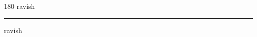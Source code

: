 
\begin{frame}
\begin{center}
\begin{turn}{180}
{\fontsize{2.5cm}{1em}\selectfont ravish}
\end{turn}
\vspace{1em}\par  
\hrule
\vspace{1em}\par  
{\fontsize{2.5cm}{1em}\selectfont ravish}
\end{center}
\end{frame}

